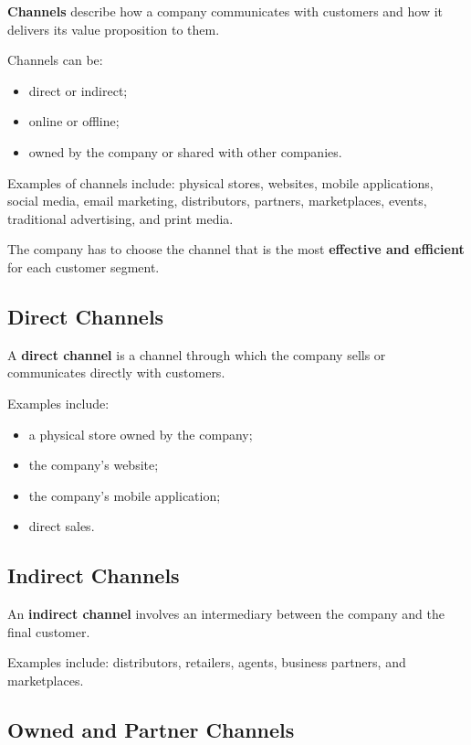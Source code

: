 \documentclass[12pt,a4paper]{report}
\begin{document}
\textbf{Channels} describe how a company communicates with customers and how it delivers its value proposition to them.

Channels can be:
\begin{itemize}
    \item direct or indirect;
    \item online or offline;
    \item owned by the company or shared with other companies.
\end{itemize}

Examples of channels include: physical stores, websites, mobile applications, social media, email marketing, distributors, partners, marketplaces, events, traditional advertising, and print media.

The company has to choose the channel that is the most \textbf{effective and efficient} for each customer segment.

\subsection{Direct Channels}

A \textbf{direct channel} is a channel through which the company sells or communicates directly with customers.

Examples include:

\begin{itemize}
    \item a physical store owned by the company;
    \item the company's website;
    \item the company's mobile application;
    \item direct sales.
\end{itemize}

\subsection{Indirect Channels}

An \textbf{indirect channel} involves an intermediary between the company and the final customer.

Examples include: distributors, retailers, agents, business partners, and marketplaces.

\subsection{Owned and Partner Channels}
\end{document}
